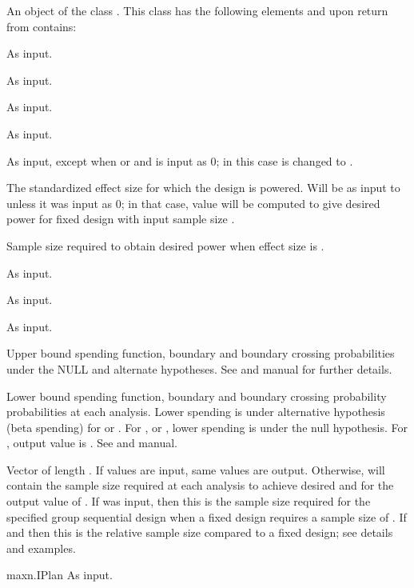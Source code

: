 \begin{Value}
An object of the class . This class has the following elements and upon return from 
 contains:
\begin{ldescription}
\item[\code{k}] As input.
\item[\code{test.type}] As input.
\item[\code{alpha}] As input.
\item[\code{beta}] As input.
\item[\code{astar}] As input, except when  or  and  is input as 0; in this case
 is changed to .
\item[\code{delta}] The standardized effect size for which the design is powered. Will be as input to 
unless it was input as 0; in that case, value will be computed to give desired power for fixed design with input
sample size .
\item[\code{n.fix}] Sample size required to obtain desired power when effect size is .
\item[\code{timing}] As input.
\item[\code{tol}] As input.
\item[\code{r}] As input.
\item[\code{upper}] Upper bound spending function, boundary and boundary crossing probabilities under the NULL and
alternate hypotheses. See  and manual for further details.
\item[\code{lower}] Lower bound spending function, boundary and boundary crossing probability probabilities at each analysis.
Lower spending is under alternative hypothesis (beta spending) for  or . 
For ,  or , lower spending is under the null hypothesis.
For , output value is . See  and manual.
\item[\code{n.I}] Vector of length . If values are input, same values are output.
Otherwise,  will contain the sample size required at each analysis 
to achieve desired  and  for the output value of . 
If  was input, then this is the sample size required for the specified group sequential design
when a fixed design requires a sample size of .
If  and  then this is the relative sample size compared to a fixed design; 
see details and examples.
\item[maxn.IPlan] As input.

\end{ldescription}
\end{Value}
